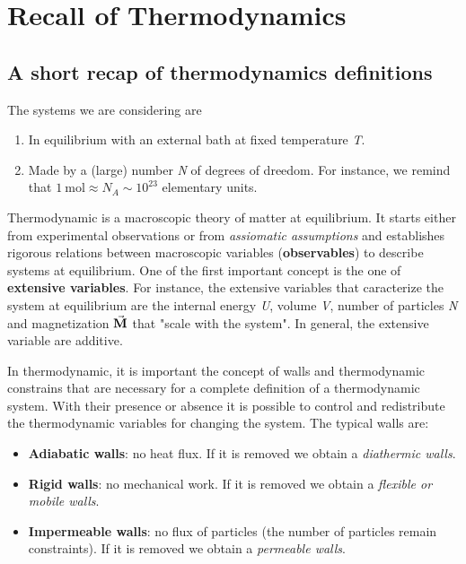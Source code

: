 \documentclass[../main/main.tex]{subfiles}
\begin{document}
\chapter{Recall of Thermodynamics}


\section{A short recap of thermodynamics definitions}
\noindent The systems we are considering are

\begin{enumerate}
\item In equilibrium with an external bath at fixed temperature \emph{T}.
\item Made by a (large) number \emph{N} of degrees of dreedom. For instance, we remind that \( \SI{1}{\mole} \approx N_A \sim 10^{23}\) elementary units.
\end{enumerate}

\noindent Thermodynamic is a macroscopic theory of matter at equilibrium.
It starts either from experimental observations or from \emph{assiomatic assumptions} and establishes rigorous relations between macroscopic variables (\textbf{observables}) to describe systems at equilibrium.
One of the first important concept is the one of \textbf{extensive variables}. For instance, the extensive variables that caracterize the system at equilibrium are the internal energy \emph{U}, volume \emph{V}, number of particles \emph{N} and magnetization \( \va{M} \) that "scale with the system".
In general, the extensive variable are additive.

In thermodynamic, it is important the concept of walls and thermodynamic constrains that are necessary for a complete definition of a thermodynamic system. With their presence or absence it is possible to control and redistribute the thermodynamic variables for changing the system.
The typical walls are:
\begin{itemize}
\item \textbf{Adiabatic walls}: no heat flux. If it is removed we obtain a \textit{diathermic walls}.
\item \textbf{Rigid walls}: no mechanical work. If it is removed we obtain a \textit{flexible or mobile walls}.
\item \textbf{Impermeable walls}: no flux of particles (the number of particles remain constraints). If it is removed we obtain a \textit{permeable walls}.
\end{itemize}
\end{document}
